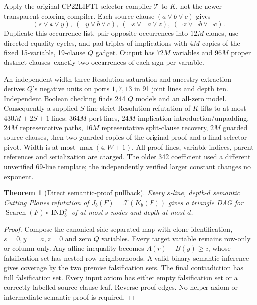 \documentclass[11pt]{article}
\newtheorem{theorem}{Theorem}
\begin{document}
Apply the original CP22LIFT1 selector compiler $\mathcal T$ to $K$, not the newer transparent coloring compiler. Each source clause $(a\vee b\vee c)$ gives
\[
(s\vee a\vee y),\ (\neg y\vee b\vee c),\ (\neg s\vee\neg a\vee z),\ (\neg z\vee\neg b\vee\neg c).
\]
Duplicate this occurrence list, pair opposite occurrences into $12M$ clones, use directed equality cycles, and pad triples of implications with $4M$ copies of the fixed 15-variable, 19-clause $Q$ gadget. Output has $72M$ variables and $96M$ proper distinct clauses, exactly two occurrences of each sign per variable.

An independent width-three Resolution saturation and ancestry extraction derives $Q$'s negative units on ports $1,7,13$ in 91 joint lines and depth ten. Independent Boolean checking finds 244 $Q$ models and an all-zero model. Consequently a supplied $S$-line strict Resolution refutation of $K$ lifts to at most $430M+2S+1$ lines: $364M$ port lines, $24M$ implication introduction/unpadding, $24M$ representative paths, $16M$ representative split-clause recovery, $2M$ guarded source clauses, then two guarded copies of the original proof and a final selector pivot. Width is at most $\max(4,W+1)$. All proof lines, variable indices, parent references and serialization are charged. The older 342 coefficient used a different unverified 69-line template; the independently verified larger constant changes no exponent.

\begin{theorem}[Direct semantic-proof pullback]
Every $s$-line, depth-$d$ semantic Cutting Planes refutation of $J_b(F)=\mathcal T(K_b(F))$ gives a triangle DAG for $\operatorname{Search}(F)\circ\operatorname{IND}_b^\nu$ of at most $s$ nodes and depth at most $d$.
\end{theorem}
\begin{proof}
Compose the canonical side-separated map with clone identification, $s=0,y=\neg a,z=0$ and zero $Q$ variables. Every target variable remains row-only or column-only. Any affine inequality becomes $A(r)+B(y)\ge c$, whose falsification set has nested row neighborhoods. A valid binary semantic inference gives coverage by the two premise falsification sets. The final contradiction has full falsification set. Every input axiom has either empty falsification set or a correctly labelled source-clause leaf. Reverse proof edges. No helper axiom or intermediate semantic proof is required.
\end{proof}
\end{document}
